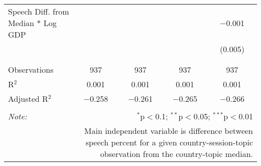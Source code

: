 \begin{table}[!htbp]
\begin{tabular}{@{\extracolsep{5pt}}lcccc}
 Speech Diff. from Median * Log GDP &  &  &  & $-$0.001 \\ 
  &  &  &  & (0.005) \\ 
  & & & & \\ 
\hline \\[-1.8ex] 
Observations & 937 & 937 & 937 & 937 \\ 
R$^{2}$ & 0.001 & 0.001 & 0.001 & 0.001 \\ 
Adjusted R$^{2}$ & $-$0.258 & $-$0.261 & $-$0.265 & $-$0.266 \\ 
\hline 
\hline \\[-1.8ex] 
\textit{Note:}  & \multicolumn{4}{r}{$^{*}$p$<$0.1; $^{**}$p$<$0.05; $^{***}$p$<$0.01} \\ 
 & \multicolumn{4}{r}{Main independent variable is difference between speech percent for a given country-session-topic observation from the country-topic median.} \\ 
\end{tabular} 
\end{table} 
